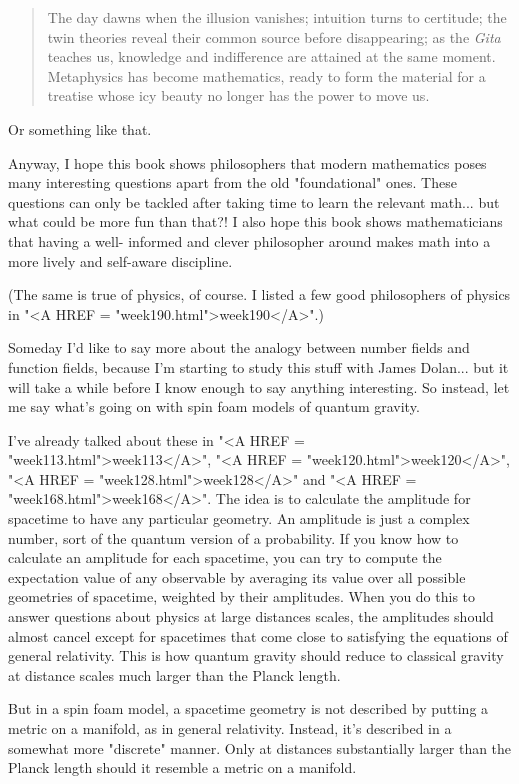 \begin{quote}
     The day dawns when the illusion vanishes; intuition
     turns to certitude; the twin theories reveal their 
     common source before disappearing; as the \emph{Gita} teaches 
     us, knowledge and indifference are attained at the same 
     moment.  Metaphysics has become mathematics, ready to
     form the material for a treatise whose icy beauty no
     longer has the power to move us.
\end{quote}
Or something like that.

Anyway, I hope this book shows philosophers that modern mathematics
poses many interesting questions apart from the old "foundational"
ones.  These questions can only be tackled after taking time to 
learn the relevant math... but what could be more fun than that?!  
I also hope this book shows mathematicians that having a well-
informed and clever philosopher around makes math into a more 
lively and self-aware discipline.

(The same is true of physics, of course.  I listed a few good 
philosophers of physics in "<A HREF = "week190.html">week190</A>".)  

Someday I'd like to say more about the analogy between number
fields and function fields, because I'm starting to study 
this stuff with James Dolan... but it will take a while 
before I know enough to say anything interesting.  So instead, 
let me say what's going on with spin foam models of quantum gravity.  

I've already talked about these 
in "<A HREF = "week113.html">week113</A>",
"<A HREF = "week120.html">week120</A>", 
"<A HREF = "week128.html">week128</A>" 
and "<A HREF = "week168.html">week168</A>".  
The idea is to calculate the amplitude for spacetime 
to have any particular geometry.  An amplitude is just a complex 
number, sort of the quantum version of a probability.  If you know 
how to calculate an amplitude for each spacetime, you can try to 
compute the expectation value of any observable by averaging its 
value over all possible geometries of spacetime, weighted by their 
amplitudes.   When you do this to answer questions about physics at 
large distances scales, the amplitudes should almost cancel except 
for spacetimes that come close to satisfying the equations of general 
relativity.  This is how quantum gravity should reduce to classical
gravity at distance scales much larger than the Planck length.

But in a spin foam model, a spacetime geometry is not described 
by putting a metric on a manifold, as in general relativity.  
Instead, it's described in a somewhat more "discrete" manner.  
Only at distances substantially larger than the Planck length 
should it resemble a metric on a manifold.

